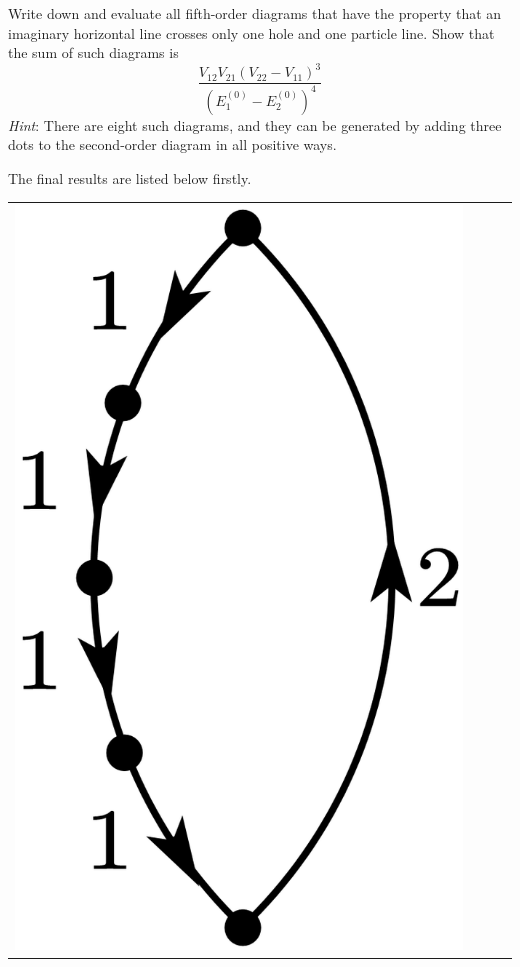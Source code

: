 \documentclass[a4paper]{book}
\newcounter{exercise}[chapter]
\newcounter{solution}[chapter]
\begin{document}
	\begin{exercise}
	Write down and evaluate all fifth-order diagrams that have the property that an imaginary horizontal line crosses only one hole and one particle line. Show that the sum of such diagrams is
	\[
		\frac{V_{12}V_{21}(V_{22}-V_{11})^3}{(E^{(0)}_1 - E^{(0)}_2)^4}
	\]
	{\it Hint}: There are eight such diagrams, and they can be generated by adding three dots to the second-order diagram in all positive ways.
	\end{exercise}
	
	\begin{solution}
	 
	The final results are listed below firstly. 
	
	\begin{center}
	\begin{tabular}{cccc}
	
		\begin{minipage}{0.22\linewidth}
		\centering
		\includegraphics[scale=1.0,trim=0 -4 0 -4]{./pictures/6.01/1.png}
		\captionof*{figure}{$\displaystyle (-1)^{4+1} \frac{ V^3_{11} V_{12} V_{21} }{ ( E^{(0)}_1 - E^{(0)}_2)^4 }$}
		\end{minipage} &
		

\end{tabular}
\end{center}
\end{solution}
\end{document}
